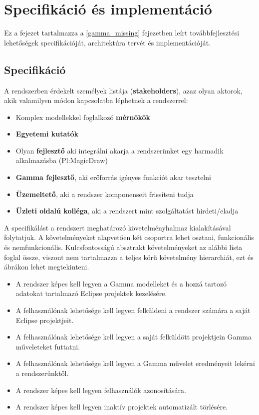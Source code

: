 \chapter{Specifikáció és implementáció}

Ez a fejezet tartalmazza a \ref{gamma_missing} fejezetben leírt továbbfejlesztési lehetőségek specifikációját, architektúra tervét és implementációját. 

\section{Specifikáció} \label{specification}


A rendszerben érdekelt személyek listája (\textbf{stakeholders}), azaz olyan aktorok, akik valamilyen módon kapcsolatba léphetnek a rendszerrel:
\begin{itemize}
	\item Komplex modellekkel foglalkozó \textbf{mérnökök}
	\item \textbf{Egyetemi kutatók}
	\item Olyan \textbf{fejlesztő} aki integrálni akarja a rendszerünket egy harmadik alkalmazásba (Pl:MagicDraw)
	\item \textbf{Gamma fejlesztő}, aki erőforrás igényes funkciót akar tesztelni
	\item \textbf{Üzemeltető}, aki a rendszer komponenseit frissíteni tudja
	\item \textbf{Üzleti oldalú kolléga}, aki a rendszert mint szolgáltatást hirdeti/eladja
\end{itemize}


A specifikálást a rendszert meghatározó követelményhalmaz kialakításával folytatjuk. A követelményeket alapvetően két csoportra lehet osztani, funkcionális és nemfunkcionális. Kulcsfontosságú absztrakt követelményeket az alábbi lista foglal össze, viszont nem tartalmazza a teljes körű követelmény hierarchiát, ezt  és  ábrákon lehet megtekinteni.

\begin{itemize}
	\item A rendszer képes kell legyen a Gamma modelleket és a hozzá tartozó adatokat tartalmazó Eclipse projektek kezelésére.
	\item A felhasználónak lehetősége kell legyen felküldeni a rendszer számára a saját Eclipse projektjeit.
	\item A felhasználónak lehetősége kell legyen a saját felküldött projektjein Gamma műveleteket futtatni.
	\item A felhasználónak lehetősége kell legyen a Gamma művelet eredményeit lekérni a rendszerünktől.
	\item A rendszer képes kell legyen felhasználók azonosítására.
	\item A rendszer képes kell legyen inaktív projektek automatizált törlésére.
\end{itemize}

